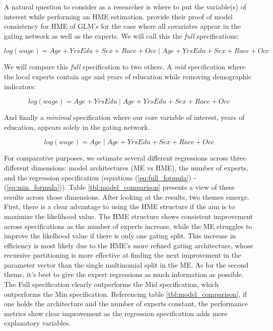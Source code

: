 \documentclass[12pt]{article}
\begin{document}
A natural question to consider as a researcher is where to put the variable(s)
of interest while performing an HME estimation. \cite{JiangTanner2000}
provide their proof of model consistency for HME of GLM's for the case where
all covariates appear in the gating network as well as the experts. We will
call this the \textit{full} specifications:

\begin{equation} \label{eq:full_formula}
  log(wage) = Age + YrsEdu + Sex +  Race + Occ \; | \; Age + YrsEdu + Sex +  Race + Occ
\end{equation}

We will compare this \textit{full} specification to two others. A
\textit{mid} specification where the local experts contain age and
years of education while removing demographic indicators:

\begin{equation} \label{eq:mid_formula}
  log(wage) = Age + YrsEdu \; | \; Age + YrsEdu + Sex +  Race + Occ
\end{equation}

And finally a \textit{minimal} specification where our core variable
of interest, years of education, appears solely in the gating network.

\begin{equation} \label{eq:min_formula}
  log(wage) = Age \; | \; Age + YrsEdu + Sex +  Race + Occ
\end{equation}

For comparative purposes, we estimate several different regressions across three
different dimensions: model architectures (ME vs HME), the number of experts,
and the regression specification (equations (\ref{eq:full_formula}) -
(\ref{eq:min_formula})). Table \ref{tbl:model_comparison} presents a view of these
results across those dimensions. After looking at the results,
two themes emerge. First, there is a clear advantage to using the HME structure
if the aim is to maximize the likelihood value. The HME structure shows consistent
improvement across specifications as the number of experts increase, while the ME
struggles to improve the likelhood value if there is only one gating split.
This increase in efficiency is most likely due
to the HME's more refined gating architecture, whose recursive partitioning is more
effective at finding the next improvement in the parameter vector than the single
multinomial split in the ME. As for the second theme, it's best to give the expert
regressions as much information as possible. The Full specification clearly outperforms
the Mid specification, which outperforms the Min specification. Referencing table
\ref{tbl:model_comparison}, if one holds the architecture and the number of experts
constant, the performance metrics show clear improvement as the regression specification
adds more explanatory variables.
\end{document}
